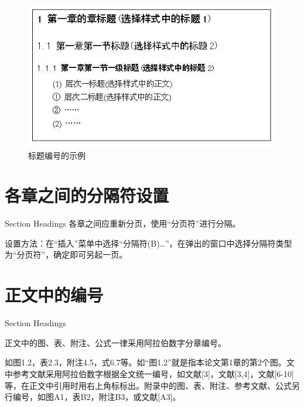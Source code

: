     \begin{figure}[!htbp]
	\centering
	\includegraphics[scale=1]{figures/title.jpg}
	\caption[fig:chap1:title]{标题编号的示例}
\end{figure}

\section{各章之间的分隔符设置}{Section Headings}
各章之间应重新分页，使用“分页符”进行分隔。

设置方法：在“插入”菜单中选择“分隔符(B)…”，在弹出的窗口中选择分隔符类型为“分页符”，确定即可另起一页。

\section{正文中的编号}{Section Headings}

正文中的图、表、附注、公式一律采用阿拉伯数字分章编号。

如图1.2，表2.3，附注4.5，式6.7等。如“图1.2”就是指本论文第1章的第2个图。文中参考文献采用阿拉伯数字根据全文统一编号，如文献[3]，文献[3,4]，文献[6-10]等，在正文中引用时用右上角标标出。附录中的图、表、附注、参考文献、公式另行编号，如图A1，表B2，附注B3，或文献[A3]。
